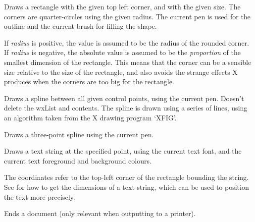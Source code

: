 

Draws a rectangle with the given top left corner, and with the given
size.  The corners are quarter-circles using the given radius. The
current pen is used for the outline and the current brush for filling
the shape.

If {\it radius} is positive, the value is assumed to be the
radius of the rounded corner. If {\it radius} is negative,
the absolute value is assumed to be the {\it proportion} of the smallest
dimension of the rectangle. This means that the corner can be
a sensible size relative to the size of the rectangle, and also avoids
the strange effects X produces when the corners are too big for
the rectangle.



Draws a spline between all given control points, using the current
pen.  Doesn't delete the wxList and contents. The spline is drawn
using a series of lines, using an algorithm taken from the X drawing
program `XFIG'.


Draws a three-point spline using the current pen.

\label{wxdcdrawtext}


Draws a text string at the specified point, using the current text font,
and the current text foreground and background colours.

The coordinates refer to the top-left corner of the rectangle bounding
the string. See  for how
to get the dimensions of a text string, which can be used to position the
text more precisely.



Ends a document (only relevant when outputting to a printer).


